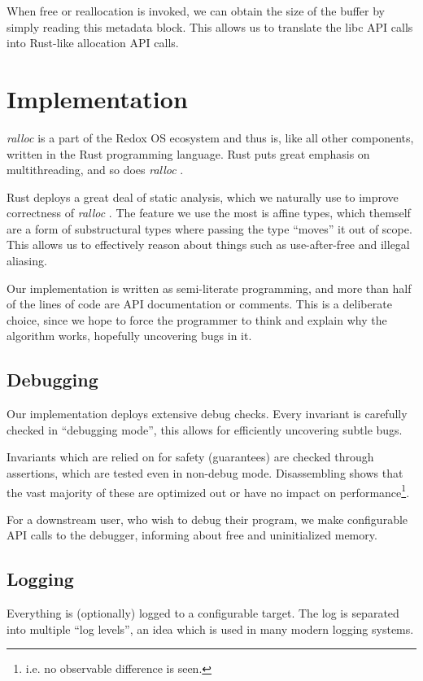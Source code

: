 \documentclass[11pt]{article}
\newcommand{\ralloc}{\emph{ralloc} }
\begin{document}
    When free or reallocation is invoked, we can obtain the size of the buffer
    by simply reading this metadata block. This allows us to translate the libc
    API calls into Rust-like allocation API calls.


    \section{Implementation}
    \ralloc is a part of the Redox OS ecosystem and thus is, like all other
    components, written in the Rust programming language. Rust puts great
    emphasis on multithreading, and so does \ralloc.

    Rust deploys a great deal of static analysis, which we naturally use to
    improve correctness of \ralloc. The feature we use the most is affine
    types, which themself are a form of substructural types where passing the
    type ``moves'' it out of scope. This allows us to effectively reason about
    things such as use-after-free and illegal aliasing.

    Our implementation is written as semi-literate programming, and more than
    half of the lines of code are API documentation or comments. This is a
    deliberate choice, since we hope to force the programmer to think and
    explain why the algorithm works, hopefully uncovering bugs in it.

    \subsection{Debugging}
    Our implementation deploys extensive debug checks. Every invariant is
    carefully checked in ``debugging mode'', this allows for efficiently
    uncovering subtle bugs.

    Invariants which are relied on for safety (guarantees) are checked through
    assertions, which are tested even in non-debug mode. Disassembling shows
    that the vast majority of these are optimized out or have no impact on
    performance\footnote{i.e. no observable difference is seen.}.

    For a downstream user, who wish to debug their program, we make
    configurable API calls to the debugger, informing about free and
    uninitialized memory.

    \subsection{Logging}
    Everything is (optionally) logged to a configurable target. The log is
    separated into multiple ``log levels'', an idea which is used in many
    modern logging systems.
\end{document}
